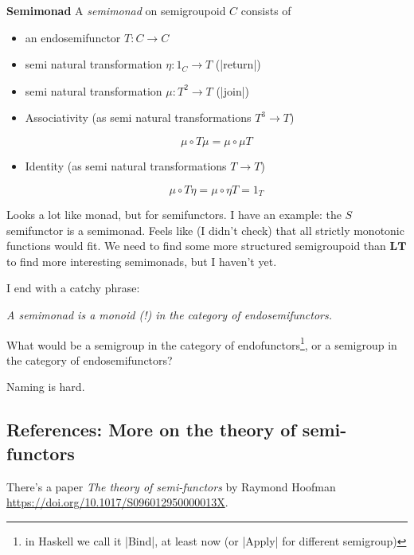 \documentclass{article}
\begin{document}
\textbf{Semimonad}
A \emph{semimonad} on semigroupoid $C$ consists of
\begin{itemize}
\item an endosemifunctor $T : C \to C$
\item semi natural transformation $\eta : 1_C \to T$ (|return|)
\item semi natural transformation $\mu : T^2 \to T$  (|join|)
\item Associativity (as semi natural transformations $T^3 \to T$)

\begin{equation}
\mu \circ T \mu = \mu \circ \mu T
\end{equation}

\item Identity (as semi natural transformations  $T \to T$)

\begin{equation}
\mu \circ T\eta = \mu \circ \eta T = 1_T
\end{equation}
\end{itemize}

Looks a lot like monad, but for semifunctors. I have an example: the $S$ semifunctor
is a semimonad. Feels like (I didn't check) that all strictly monotonic functions would fit.
We need to find some more structured semigroupoid than $\mathbf{LT}$ to find more interesting semimonads, but I haven't yet.

I end with a catchy phrase:

\emph{A semimonad is a monoid (!) in the category of endosemifunctors.}

What would be a semigroup in the category of endofunctors\footnote{in Haskell we call it |Bind|, at least now (or |Apply| for different semigroup)}, or
a semigroup in the category of endosemifunctors?

Naming is hard.

\subsection{References: More on the theory of semi-functors}

There's a paper \emph{The theory of semi-functors} by
Raymond Hoofman \url{https://doi.org/10.1017/S096012950000013X}.
\end{document}
